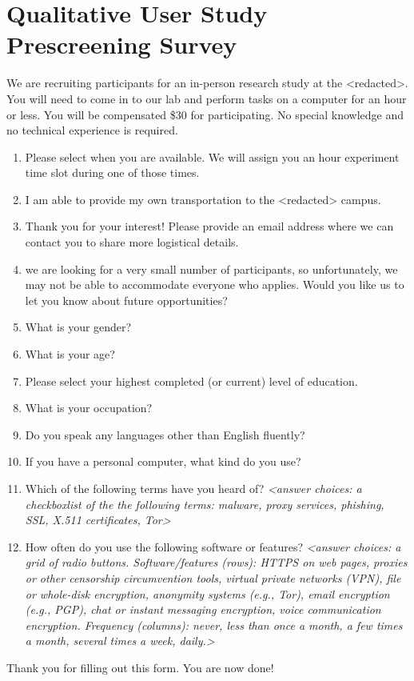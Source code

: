 \documentclass[USenglish,oneside,twocolumn]{article}
\begin{document}
\section{Qualitative User Study Prescreening Survey} 
\label{qualitative-prescreening}
We are recruiting participants for an in-person research study at the <redacted>. %
You will need to come in to our lab and perform tasks on a computer for an hour or less. You will be compensated \$30 for participating. No special knowledge and no technical experience is required.\\

\begin{enumerate}
\item{Please select when you are available. We will assign you an hour experiment time slot during one of those times.}
\item{I am able to provide my own transportation to the <redacted> %
campus.}
\item{Thank you for your interest! Please provide an email address where we can contact you to share more logistical details.}
\item{we are looking for a very small number of participants, so unfortunately, we may not be able to accommodate everyone who applies. Would you like us to let you know about future opportunities?}
\item{What is your gender?}
\item{What is your age?}
\item{Please select your highest completed (or current) level of education.}
\item{What is your occupation?} 
\item{Do you speak any languages other than English fluently?}
\item{If you have a personal computer, what kind do you use?}
\item{Which of the following terms have you heard of? \textit{<answer choices: a checkboxlist of the the following terms: malware, proxy services, phishing, SSL, X.511 certificates, Tor>}}
\item{How often do you use the following software or features? \textit{<answer choices: a grid of radio buttons. Software/features (rows): HTTPS on web pages, proxies or other censorship circumvention tools, virtual private networks (VPN), file or whole-disk encryption, anonymity systems (e.g., Tor), email encryption (e.g., PGP), chat or instant messaging encryption, voice communication encryption. Frequency (columns): never, less than once a month, a few times a month, several times a week, daily.>}}
\end{enumerate}
Thank you for filling out this form. You are now done!
\end{document}
